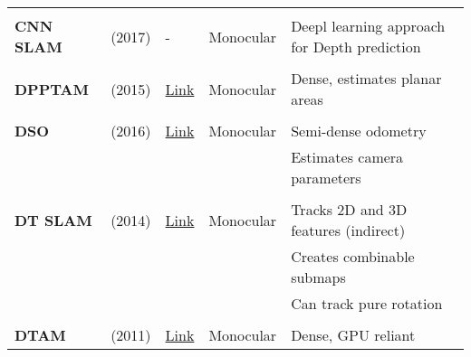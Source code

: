 {\begin{longtable}{l|l|l|l|l}
			&                                   &                                                                    &                       &\\
			\textbf{CNN SLAM}      & \cite{Tateno2017} (2017)          & -                                                                  & Monocular             & Deepl learning approach for Depth prediction\\
			&                                   &                                                                    &                       &\\
			\textbf{DPPTAM}        & \cite{Concha2015b} (2015)         & {\href{https://github.com/alejocb/dpptam}{Link}}                   & Monocular             & Dense, estimates planar areas\\
			&                                   &                                                                    &                       &\\
			\textbf{DSO}           & \cite{Engel-et-al-pami2018} (2016)           & {\href{https://github.com/JakobEngel/dso}{Link}}                   & Monocular             & Semi-dense odometry\\
			&                                   &                                                                    &                       & Estimates camera parameters\\
			&                                   &                                                                    &                       &\\
			\textbf{DT SLAM}       & \cite{Daniel2014} (2014)          & {\href{https://github.com/plumonito/dtslam}{Link}}                 & Monocular             & Tracks 2D and 3D features (indirect)\\
			&                                   &                                                                    &                       & Creates combinable submaps\\
			&                                   &                                                                    &                       & Can track pure rotation\\
			&                                   &                                                                    &                       &\\
			\textbf{DTAM}          & \cite{Newcombe2011} (2011)        & {\href{https://github.com/anuranbaka/OpenDTAM}{Link}}              & Monocular             & Dense, GPU reliant\\

\end{longtable}}
